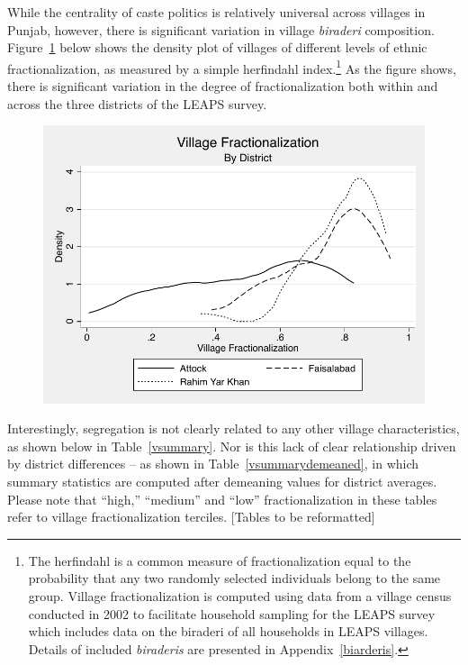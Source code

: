 \documentclass[12pt]{article}
\begin{document}
While the centrality of caste politics is relatively universal across villages in Punjab, however, there is significant variation in village \emph{biraderi} composition. Figure~\ref{fracdensities} below shows the density plot of villages of different levels of ethnic fractionalization, as measured by a simple herfindahl index.\footnote{The herfindahl is a common measure of fractionalization equal to the probability that any two randomly selected individuals belong to the same group. Village fractionalization is computed using data from a village census conducted in 2002 to facilitate household sampling for the LEAPS survey which includes data on the biraderi of all households in LEAPS villages. Details of included \emph{biraderis} are presented in Appendix~\ref{biarderis}.} As the figure shows, there is significant variation in the degree of fractionalization both within and across the three districts of the LEAPS survey.

\begin{figure}[htb]
	\begin{center}
	\caption{}\label{fracdensities}
	\includegraphics[scale=1.0]{graphs/village_frac_by_district.pdf}
	\end{center}
\end{figure}

Interestingly, segregation is not clearly related to any other village characteristics, as shown below in Table~\ref{vsummary}. Nor is this lack of clear relationship driven by district differences -- as shown in Table~\ref{vsummarydemeaned}, in which summary statistics are computed after demeaning values for district averages. Please note that ``high,'' ``medium'' and ``low'' fractionalization in these tables refer to village fractionalization terciles. [Tables to be reformatted]
\end{document}

